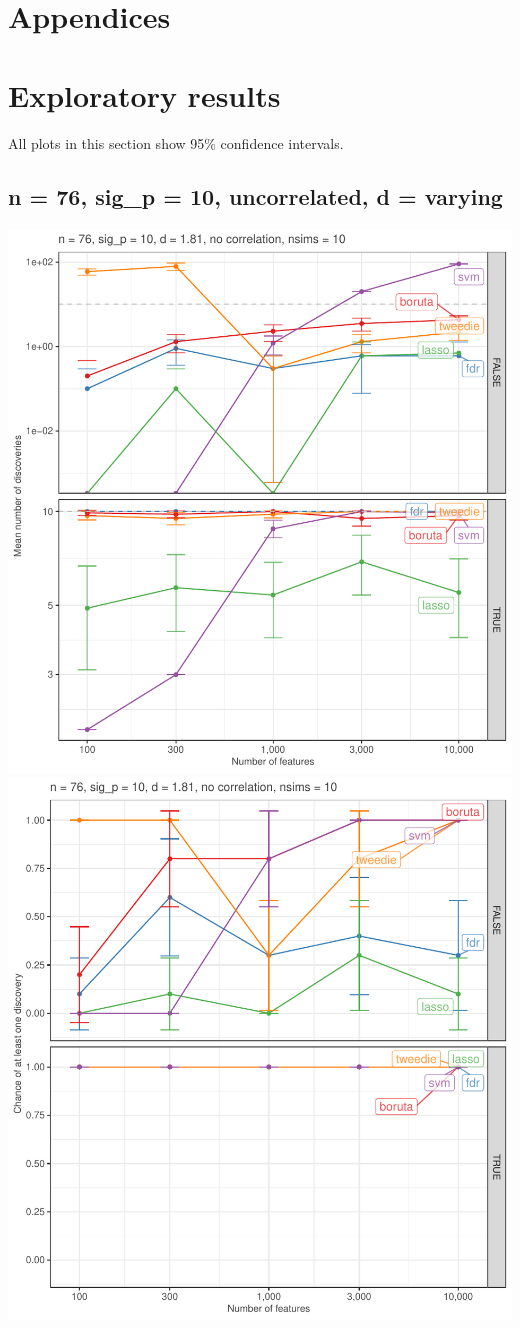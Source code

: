 \documentclass[
]{article}
\begin{document}
\newpage

\hypertarget{appendices}{%
\section{Appendices}\label{appendices}}

\hypertarget{appendix-appendix}{%
\appendix}


\hypertarget{exploratory}{%
\section{Exploratory results}\label{exploratory}}

All plots in this section show 95\% confidence intervals.

\hypertarget{n-76-sig_p-10-uncorrelated-d-varying}{%
\subsection{n = 76, sig\_p = 10, uncorrelated, d = varying}\label{n-76-sig_p-10-uncorrelated-d-varying}}

\begin{center}\includegraphics[width=0.49\linewidth]{main_files/figure-latex/unnamed-chunk-7-1} \includegraphics[width=0.49\linewidth]{main_files/figure-latex/unnamed-chunk-7-2} \end{center}
\end{document}
